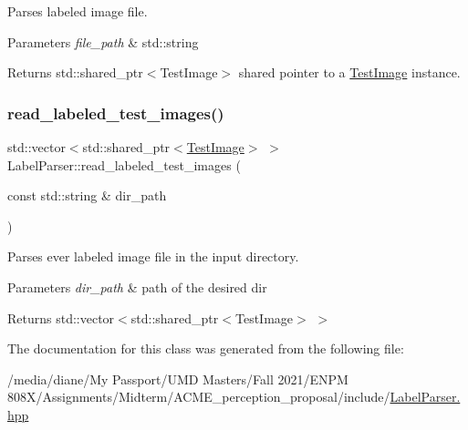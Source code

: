 Parses labeled image file. 


\begin{DoxyParams}{Parameters}
{\em file\+\_\+path} & std\+::string \\
\hline
\end{DoxyParams}
\begin{DoxyReturn}{Returns}
std\+::shared\+\_\+ptr$<$\+Test\+Image$>$ shared pointer to a \hyperlink{struct_test_image}{Test\+Image} instance. 
\end{DoxyReturn}
\mbox{\label{class_label_parser_a2de825ad0f48b9e5b8b3a27c2cf697a7}} 
\subsubsection{\texorpdfstring{read\+\_\+labeled\+\_\+test\+\_\+images()}{read\_labeled\_test\_images()}}
{\footnotesize\ttfamily std\+::vector$<$std\+::shared\+\_\+ptr$<$\hyperlink{struct_test_image}{Test\+Image}$>$ $>$ Label\+Parser\+::read\+\_\+labeled\+\_\+test\+\_\+images (\begin{DoxyParamCaption}\item[{const std\+::string \&}]{dir\+\_\+path }\end{DoxyParamCaption})}



Parses ever labeled image file in the input directory. 


\begin{DoxyParams}{Parameters}
{\em dir\+\_\+path} & path of the desired dir \\
\hline
\end{DoxyParams}
\begin{DoxyReturn}{Returns}
std\+::vector$<$std\+::shared\+\_\+ptr$<$\+Test\+Image$>$ $>$ 
\end{DoxyReturn}


The documentation for this class was generated from the following file\+:\begin{DoxyCompactItemize}
\item 
/media/diane/\+My Passport/\+U\+M\+D Masters/\+Fall 2021/\+E\+N\+P\+M 808\+X/\+Assignments/\+Midterm/\+A\+C\+M\+E\+\_\+perception\+\_\+proposal/include/\hyperlink{_label_parser_8hpp}{Label\+Parser.\+hpp}\end{DoxyCompactItemize}
